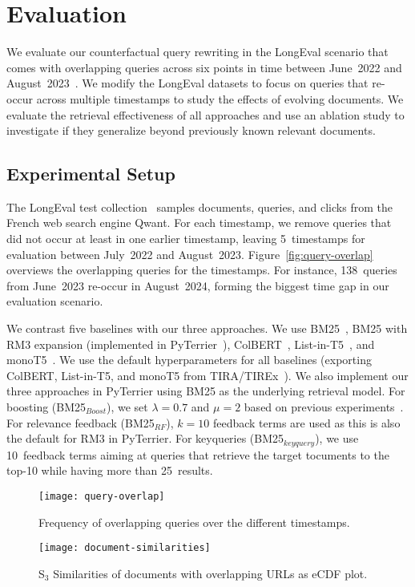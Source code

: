 \section{Evaluation}

We evaluate our counterfactual query rewriting in the LongEval scenario that comes with overlapping queries across six points in time between June~2022 and August~2023~\cite{alkhalifa:2023,alkhalifa:2024,galuscakova:2023}. We modify the LongEval datasets to focus on queries that re-occur across multiple timestamps to study the effects of evolving documents. We evaluate the retrieval effectiveness of all approaches and use an ablation study to investigate if they generalize beyond previously known relevant documents.

\subsection{Experimental Setup}
The LongEval test collection~\cite{galuscakova:2023} samples documents, queries, and clicks from the French web search engine Qwant. For each timestamp, we remove queries that did not occur at least in one earlier timestamp, leaving 5~time\-stamps for evaluation between July~2022 and August~2023. Figure~\ref{fig:query-overlap} overviews the overlapping queries for the timestamps. For instance, 138~queries from June~2023 re-occur in August~2024, forming the biggest time gap in our evaluation scenario.

We contrast five baselines with our three approaches. We use BM25~\cite{robertson:1994}, BM25 with RM3 expansion (implemented in PyTerrier~\cite{macdonald:2020}), ColBERT~\cite{khattab:2020}, List-in-T5~\cite{tamber:2023}, and monoT5~\cite{nogueira:2020}. We use the default hyperparameters for all baselines (exporting ColBERT, List-in-T5, and monoT5 from TIRA/TIREx~\cite{froebe:2023e,froebe:2023b}). We also implement our three approaches in PyTerrier using BM25 as the underlying retrieval model. For boosting (BM25$_{Boost}$), we set $\lambda=0.7$ and $\mu=2$ based on previous experiments~\cite{keller:2024b}. For relevance feedback (BM25$_{RF}$), $k=10$ feedback terms are used as this is also the default for RM3 in PyTerrier. For keyqueries (BM25$_{keyquery}$), we use 10~feedback terms aiming at queries that retrieve the target tocuments to the top-10 while having more than 25~results.

\begin{figure}[t]
    \begin{minipage}{.48\textwidth}
        \texttt{[image: query-overlap]}
        \vspace{-4ex}
        \caption{Frequency of overlapping queries over the different timestamps.}
        \label{fig:query-overlap}
    \end{minipage}
    \hfill    
    \begin{minipage}{.50\textwidth}
        \texttt{[image: document-similarities]}
        \vspace{-4ex}
        \caption{S$_{3}$ Similarities of documents with overlapping URLs as eCDF plot.}
        \label{fig:document-similarities}
    \end{minipage}
\end{figure}

